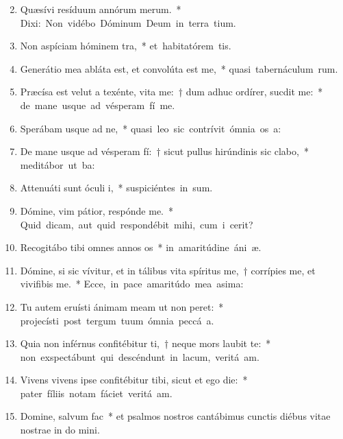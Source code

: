 \begin{flushleft}
\begin{enumerate}[leftmargin=*]
\setcounter{enumi}{1}


\item Quæsívi resíduum annórum merum.~* \mbox{Dixi: Non vidébo Dóminum Deum in terra tium.}
\item Non aspíciam hóminem tra,~* \mbox{et habitatórem tis.}
\item Generátio mea abláta est, et convolúta est  me,~* \mbox{quasi tabernáculum rum.}
\item Præcísa est velut a texénte, vita me:~† dum adhuc ordírer, sucdit me:~* \mbox{de mane usque ad vésperam fí me.}
\item Sperábam usque ad ne,~* \mbox{quasi leo sic contrívit ómnia os a:}
\item De mane usque ad vésperam fí:~† sicut pullus hirúndinis sic clabo,~* \mbox{meditábor ut ba:}
\item Attenuáti sunt óculi i,~* \mbox{suspiciéntes in sum.}
\item Dómine, vim pátior, respónde  me.~* \mbox{Quid dicam, aut quid respondébit mihi, cum i cerit?}
\item Recogitábo tibi omnes annos os~* \mbox{in amaritúdine áni æ.}
\item Dómine, si sic vívitur, et in tálibus vita spíritus me,~† corrípies me, et vivifibis me.~* \mbox{Ecce, in pace amaritúdo mea asima:}
\item Tu autem eruísti ánimam meam ut non peret:~* \mbox{projecísti post tergum tuum ómnia peccá a.}
\item Quia non inférnus confitébitur ti,~† neque mors laubit te:~* \mbox{non exspectábunt qui descéndunt in lacum, veritá am.}
\item Vivens vivens ipse confitébitur tibi, sicut et ego die:~* \mbox{pater fíliis notam fáciet veritá am.}
\item Domine, salvum  fac~* et psalmos nostros cantábimus cunctis diébus vitae nostrae in do mini.

\end{enumerate}
\end{flushleft}

